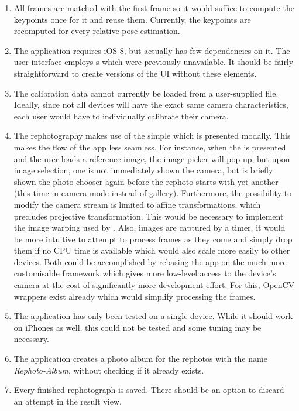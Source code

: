 \begin{enumerate}
   \item All frames are matched with the first frame so it would suffice to
      compute the keypoints once for it and reuse them. Currently, the keypoints
      are recomputed for every relative pose estimation.

   \item The application requires iOS 8, but actually has few dependencies on
      it. The user interface employs s which were
      previously unavailable. It should be fairly straightforward to create
      versions of the UI without these elements.

   \item The calibration data cannot currently be loaded from a user-supplied
      file. Ideally, since not all devices will have the exact same camera
      characteristics, each user would have to individually calibrate their
      camera.

   \item The rephotography makes use of the simple
       which is presented modally. This makes the
      flow of the app less seamless. For instance, when the
       is presented and the user loads a reference image,
      the image picker will pop up, but upon image selection, one is not
      immediately shown the camera, but is briefly shown the photo chooser again
      before the rephoto starts with yet another 
      (this time in camera mode instead of gallery).
      Furthermore, the possibility to modify the camera stream is limited to
      affine transformations, which precludes projective transformation. This
      would be necessary to implement the image warping used by \citet{bae2010}.
      Also, images are captured by a timer, it would be more intuitive to
      attempt to process frames as they come and simply drop them if no CPU time
      is available which would also scale more easily to other devices. Both
      could be accomplished by rebasing the app on the much more customisable
       framework which gives more low-level access to the device's
      camera at the cost of significantly more development effort.
      For this, OpenCV wrappers exist already which would simplify processing the frames.  

   \item The application has only been tested on a single device. While it
      should work on iPhones as well, this could not be tested and some tuning
      may be necessary.

   \item The application creates a photo album for the rephotos with the name
      \emph{Rephoto-Album}, without checking if it already exists.

   \item Every finished rephotograph is saved. There should be an option to
      discard an attempt in the result view.

\end{enumerate}


